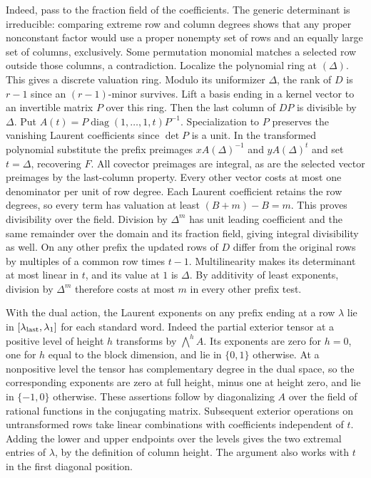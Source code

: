 \documentclass[11pt]{amsart}
\theoremstyle{definition}
\theoremstyle{remark}
\begin{document}
Indeed, pass to the fraction field of the coefficients. The generic
determinant is irreducible: comparing extreme row and column
degrees shows that any proper nonconstant factor would use a proper
nonempty set of rows and an equally large set of columns, exclusively.
Some permutation monomial matches a selected row outside those
columns, a contradiction. Localize the polynomial ring at $(\Delta)$.
This gives a discrete valuation ring. Modulo its uniformizer
$\Delta$, the rank of $D$ is $r-1$ since an $(r-1)$-minor survives.
Lift a basis ending in a kernel vector to an invertible matrix $P$
over this ring. Then the last column of $DP$ is divisible by
$\Delta$. Put $A(t)=P\operatorname{diag}(1,\ldots,1,t)P^{-1}$.
Specialization to $P$ preserves the vanishing Laurent coefficients
since $\det P$ is a unit. In the transformed polynomial substitute
the prefix preimages $xA(\Delta)^{-1}$ and $yA(\Delta)^t$ and set
$t=\Delta$, recovering $F$. All covector preimages are integral,
as are the selected vector preimages by the last-column property.
Every other vector costs at most one denominator per unit of row
degree. Each Laurent coefficient retains the row degrees, so every
term has valuation at least $(B+m)-B=m$. This proves divisibility
over the field. Division by $\Delta^m$ has unit leading coefficient
and the same remainder over the domain and its fraction field,
giving integral divisibility as well. On any other prefix the
updated rows of $D$ differ from the original rows by multiples
of a common row times $t-1$. Multilinearity makes its determinant
at most linear in $t$, and its value at $1$ is $\Delta$. By
additivity of least exponents, division by $\Delta^m$ therefore
costs at most $m$ in every other prefix test.

With the dual action, the Laurent exponents on any prefix ending
at a row $\lambda$ lie in $[\lambda_{\rm last},\lambda_1]$ for
each standard word. Indeed the partial exterior tensor at a
positive level of height $h$ transforms by $\bigwedge^h A$.
Its exponents are zero for $h=0$, one for $h$ equal to the block
dimension, and lie in $\{0,1\}$ otherwise. At a nonpositive
level the tensor has complementary degree in the dual space, so
the corresponding exponents are zero at full height, minus one
at height zero, and lie in $\{-1,0\}$ otherwise. These assertions
follow by diagonalizing $A$ over the field of rational functions
in the conjugating matrix. Subsequent exterior operations on
untransformed rows take linear combinations with coefficients
independent of $t$. Adding the lower and upper endpoints over
the levels gives the two extremal entries of $\lambda$, by the
definition of column height. The argument also works with $t$ in
the first diagonal position.
\end{document}
